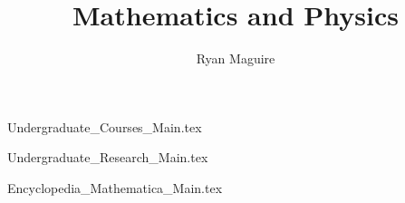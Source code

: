 \documentclass[oneside]{book}
\title{Mathematics and Physics}
\author{Ryan Maguire}
\date{\vspace{-5ex}}
\begin{document}
\maketitle
\tableofcontents
\listoffigures
\listoftables
\clearpage
{}
{Undergraduate_Courses_Main.tex}
{Undergraduate_Research_Main.tex}
{Encyclopedia_Mathematica_Main.tex}
\clearpage
\printglossary[type=\acronymtype]
\clearpage
\printglossary[style=long]
\clearpage

\end{document}
